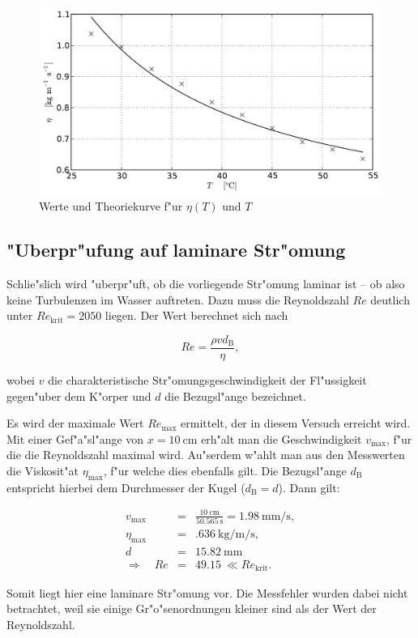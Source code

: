		\begin{figure}[h!]
			\centering
			\includegraphics[width = 15cm]{img/plot2.pdf}
			\caption{Werte und Theoriekurve f"ur $\eta(T)$ und $T$}
			\label{fig:graph}
		\end{figure}

	\clearpage

	\subsection{"Uberpr"ufung auf laminare Str"omung}
		\label{sub:laminar}

		Schlie"slich wird "uberpr"uft, ob die vorliegende Str"omung laminar ist -- ob also keine Turbulenzen im Wasser auftreten.
		Dazu muss die Reynoldszahl $Re$ deutlich unter $Re_\mathrm{krit} = 2050$ liegen.
		Der Wert berechnet sich nach

		\begin{equation*}
			Re = \frac{\rho v d_\mathrm{B}}{\eta} ,
		\end{equation*}

		wobei $v$ die charakteristische Str"omungsgeschwindigkeit der Fl"ussigkeit gegen"uber dem K"orper und $d$ die Bezugsl"ange bezeichnet.

		Es wird der maximale Wert $Re_\mathrm{max}$ ermittelt, der in diesem Versuch erreicht wird.
		Mit einer Gef"a"sl"ange von $x = \SI{10}{\centi \meter}$ erh"alt man die Geschwindigkeit $v_\mathrm{max}$, f"ur die die Reynoldszahl maximal wird.
		Au"serdem w"ahlt man aus den Messwerten die Viskosit"at $\eta_\mathrm{max}$, f"ur welche dies ebenfalls gilt.
		Die Bezugsl"ange $d_\mathrm{B}$ entspricht hierbei dem Durch\-messer der Kugel ($d_\mathrm{B} = d$).
		Dann gilt:

		\begin{eqnarray*}
			v_\mathrm{max} & = & \frac{\SI{10}{\centi \meter}}{\SI{50.565}{\second}} = \SI{1.98}{\milli \meter \per \second} , \\
			\eta_\mathrm{max} & = & \SI{.636}{\kilo \gram \per \meter \per \second} , \\
			d & = & \SI{15.82}{\milli \meter} \\
			\Rightarrow \quad Re & = & \SI{49.15}{} \ll Re_\mathrm{krit} .
		\end{eqnarray*}

		Somit liegt hier eine laminare Str"omung vor.
		Die Messfehler wurden dabei nicht be\-trach\-tet, weil sie einige Gr"o"senordnungen kleiner sind als der Wert der Reynoldszahl.
